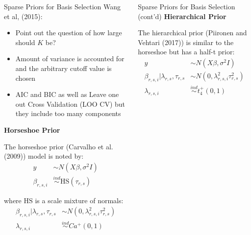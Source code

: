 \documentclass[final]{beamer}
\newlength{\onecolwid}
\newlength{\twocolwid}
\begin{document}
\begin{frame}[t]
\begin{columns}[t]
\begin{column}{\twocolwid}
\begin{columns}[t,totalwidth=\twocolwid]
\begin{column}{\onecolwid}
\begin{block}{Sparse Priors for Basis Selection}
Wang et al, (2015):
\begin{itemize}
\item Point out the question of how large should $K$ be?
\item Amount of variance is accounted for and the arbitrary cutoff value is chosen
\item AIC and BIC as well as Leave one out Cross Validation (LOO CV) but they include too many components \\
\end{itemize}

\vspace{10mm}

\textbf{Horseshoe Prior}

The horseshoe prior (Carvalho et al. (2009)) model is noted by:
\begin{align}
y &\sim N(X\beta, \sigma^2 I) \nonumber \\
\beta_{r,s,i} &\overset{ind}{\sim} \text{HS}(\tau_{r,s})
\end{align}

where $\text{HS}$ is a scale mixture of normals:
\begin{align}
\beta_{r,s,i} | \lambda_{r,s}, \tau_{r,s} &\sim N(0, \lambda_{r,s,i}^2 \tau_{r,s}^2) \nonumber \\
\lambda_{r,s,i} &\overset{ind}{\sim} Ca^{+}(0,1)
\end{align}

\end{block}


\end{column} %

\begin{column}{\onecolwid}\vspace{-.6in} %


\begin{block}{Sparse Priors for Basis Selection (cont'd)}
\textbf{Hierarchical Prior}

The hierarchical prior (Piironen and Vehtari (2017)) is similar to the horseshoe but has a half-t prior:
\begin{align}
y &\sim N(X\beta, \sigma^2 I) \nonumber \\
\beta_{r,s,i} | \lambda_{r,s}, \tau_{r,s} &\sim N(0, \lambda_{r,s,i}^2 \tau_{r,s}^2) \nonumber \\
\lambda_{r,s,i} &\overset{ind}{\sim} t^{+}_{4}(0,1)
\end{align}


\end{block}
\end{column}
\end{columns}
\end{column}
\end{columns}
\end{frame}
\end{document}
